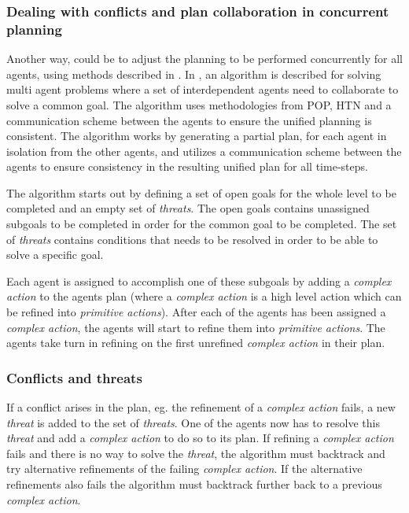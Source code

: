 \documentclass[Main]{subfiles}
\begin{document}
\subsubsection{Dealing with conflicts and plan collaboration in concurrent planning}
Another way, could be to adjust the planning to be performed concurrently for
all agents, using methods described in \citep{pellier2007unified}.
In \citep{pellier2007unified}, an algorithm is described for solving multi agent problems where
a set of interdependent agents need to collaborate to solve a common goal.
The algorithm uses methodologies from POP, HTN and a communication scheme
between the agents to ensure the unified planning is consistent.
The algorithm works by generating a partial plan, for each agent in isolation
from the other agents, and utilizes a communication scheme between the agents to
ensure consistency in the resulting unified plan for all time-steps.

The algorithm starts out by defining a set of open goals for the whole level to
be completed and an empty set of \textit{threats}. The open goals contains
unassigned subgoals to be completed in order for the common goal to be
completed. The set of \textit{threats} contains conditions that needs to be
resolved in order to be able to solve a specific goal.

Each agent is assigned to accomplish one of these subgoals by adding a
\textit{complex action} to the agents plan (where a \textit{complex action} is a
high level action which can be refined into \textit{primitive actions}).
After each of the agents has been assigned a \textit{complex action}, the agents
will start to refine them into \textit{primitive actions}.
The agents take turn in refining on the first unrefined \textit{complex action} in their plan.

\subsubsection{Conflicts and threats}
If a conflict arises in the plan, eg. the refinement of a \textit{complex
  action} fails, a new \textit{threat} is added to the set of \textit{threats}.
One of the agents now has to resolve this \textit{threat} and add a \textit{complex action} to do so to its plan.
If refining a \textit{complex action} fails and there is no way to solve the
\textit{threat}, the algorithm must backtrack and try alternative refinements of
the failing \textit{complex action}. If the alternative refinements also fails
the algorithm must backtrack further back to a previous \textit{complex action}.
\end{document}
